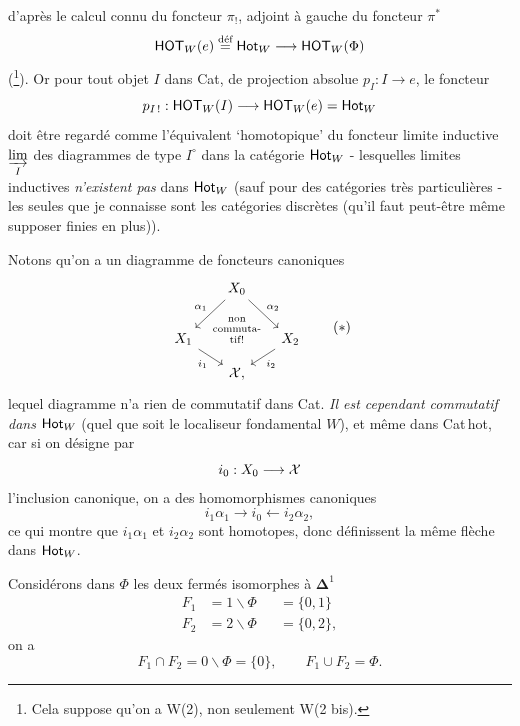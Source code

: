 \dgrchunkbegin

d'après le calcul connu du foncteur $\pi_!$, adjoint à gauche du foncteur $\pi^*$
\[
\mathsf{HOT}_W(e) \overset{\text{déf}}{=} \mathsf{Hot}_W \longrightarrow \mathsf{HOT}_W(\Phi)
\]
(\footnote[84]{Cela suppose qu'on a W(2), non seulement W(2 bis).}). Or pour tout objet $I$ dans Cat, de projection absolue $p_I : I \longrightarrow e$, le foncteur
\[
p_{I\,!} : \mathsf{HOT}_W(I) \longrightarrow \mathsf{HOT}_W(e) = \mathsf{Hot}_W
\]
doit être regardé comme l'équivalent `homotopique' du foncteur limite inductive $\varinjlim\limits_{I}$ des diagrammes de type $I^{\circ}$ dans la catégorie $\mathsf{Hot}_W$ - lesquelles limites inductives \textit{n'existent pas} dans $\mathsf{Hot}_W$ (sauf
pour des catégories très particulières - les seules que je connaisse sont les catégories discrètes (qu'il faut peut-être même supposer finies en plus)).

Notons qu'on a un diagramme de foncteurs canoniques
\[
\begin{tikzcd}[column sep=tiny, row sep=small, ampersand replacement=\&]
 \& X_0 \arrow[dl, "\alpha_1"'] \arrow[dr, "\alpha_2"] \& \\
X_1 \arrow[dr, "i_1"'] \& {\shortstack{\scriptsize non\\ \scriptsize commuta-\\ \scriptsize tif!}} \& X_2 \arrow[dl, "i_2"] \\
 \& \cX, \&
\end{tikzcd}
\tag*{$(*)$}
\]
lequel diagramme n'a rien de commutatif dans Cat. \textit{Il est cependant commutatif dans} $\mathsf{Hot}_W$ (quel que soit le localiseur fondamental $W$), et même dans Cat\,hot, car si on désigne par
\[
i_0 : X_0 \longrightarrow \mathcal{X}
\]
l'inclusion canonique, on a des homomorphismes canoniques
\[
i_1\alpha_1 \longrightarrow i_0 \longleftarrow i_2\alpha_2,
\]
ce qui montre que $i_1\alpha_1$ et $i_2\alpha_2$ sont homotopes, donc définissent la même flèche dans $\mathsf{Hot}_W$.

Considérons dans $\Phi$ les deux fermés isomorphes à $\boldsymbol{\Delta}^1$
\[
\begin{aligned}
F_1 &= 1\backslash\Phi &&= \{0,1\}\\
F_2 &= 2\backslash\Phi &&= \{0,2\},
\end{aligned}
\]
on a
\[
F_1\cap F_2 = 0\backslash\Phi = \{0\}, \qquad F_1\cup F_2 = \Phi.
\]

